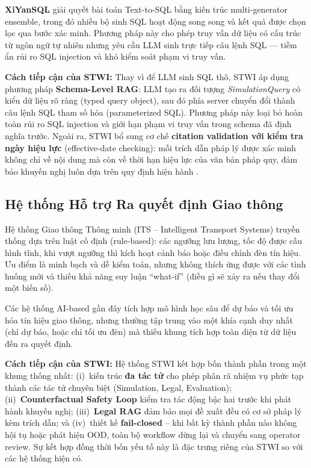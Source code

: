 \textbf{XiYanSQL} \cite{guo2023xiyansql} giải quyết bài toán Text-to-SQL bằng kiến trúc multi-generator ensemble, trong đó nhiều bộ sinh SQL hoạt động song song và kết quả được chọn lọc qua bước xác minh. Phương pháp này cho phép truy vấn dữ liệu có cấu trúc từ ngôn ngữ tự nhiên nhưng yêu cầu LLM sinh trực tiếp câu lệnh SQL --- tiềm ẩn rủi ro SQL injection và khó kiểm soát phạm vi truy vấn.

\textbf{Cách tiếp cận của STWI:} Thay vì để LLM sinh SQL thô, STWI áp dụng phương pháp \textbf{Schema-Level RAG}: LLM tạo ra đối tượng \textit{SimulationQuery} có kiểu dữ liệu rõ ràng (typed query object), sau đó phía server chuyển đổi thành câu lệnh SQL tham số hóa (parameterized SQL). Phương pháp này loại bỏ hoàn toàn rủi ro SQL injection và giới hạn phạm vi truy vấn trong schema đã định nghĩa trước. Ngoài ra, STWI bổ sung cơ chế \textbf{citation validation với kiểm tra ngày hiệu lực} (effective-date checking): mỗi trích dẫn pháp lý được xác minh không chỉ về nội dung mà còn về thời hạn hiệu lực của văn bản pháp quy, đảm bảo khuyến nghị luôn dựa trên quy định hiện hành \cite{gtvt2023law}.

\subsection{Hệ thống Hỗ trợ Ra quyết định Giao thông}

Hệ thống Giao thông Thông minh (ITS -- Intelligent Transport Systems) truyền thống dựa trên luật cố định (rule-based): các ngưỡng lưu lượng, tốc độ được cấu hình tĩnh, khi vượt ngưỡng thì kích hoạt cảnh báo hoặc điều chỉnh đèn tín hiệu. Ưu điểm là minh bạch và dễ kiểm toán, nhưng không thích ứng được với các tình huống mới và thiếu khả năng suy luận ``what-if'' (điều gì sẽ xảy ra nếu thay đổi một biến số).

Các hệ thống AI-based gần đây tích hợp mô hình học sâu để dự báo và tối ưu hóa tín hiệu giao thông, nhưng thường tập trung vào một khía cạnh duy nhất (chỉ dự báo, hoặc chỉ tối ưu đèn) mà thiếu khung tích hợp toàn diện từ dữ liệu đến ra quyết định.

\textbf{Cách tiếp cận của STWI:} Hệ thống STWI kết hợp bốn thành phần trong một khung thống nhất: (i)~kiến trúc \textbf{đa tác tử} \cite{wooldridge2009multiagent} cho phép phân rã nhiệm vụ phức tạp thành các tác tử chuyên biệt (Simulation, Legal, Evaluation); (ii)~\textbf{Counterfactual Safety Loop} \cite{pearl2018why} kiểm tra tác động bậc hai trước khi phát hành khuyến nghị; (iii)~\textbf{Legal RAG} \cite{lewis2020rag} đảm bảo mọi đề xuất đều có cơ sở pháp lý kèm trích dẫn; và (iv)~thiết kế \textbf{fail-closed} -- khi bất kỳ thành phần nào không hội tụ hoặc phát hiện OOD, toàn bộ workflow dừng lại và chuyển sang operator review. Sự kết hợp đồng thời bốn yếu tố này là đặc trưng riêng của STWI so với các hệ thống hiện có.

